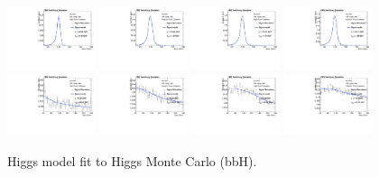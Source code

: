 \begin{figure}[thb]
  \centering
\includegraphics[width=0.23\textwidth]{figures/sec-signals/HiggsShapes/bbh_HM_signal_fit_mgg_cat0.pdf}
\includegraphics[width=0.23\textwidth]{figures/sec-signals/HiggsShapes/bbh_HM_signal_fit_mgg_cat1.pdf}
\includegraphics[width=0.23\textwidth]{figures/sec-signals/HiggsShapes/bbh_LM_signal_fit_mgg_cat0.pdf}
\includegraphics[width=0.23\textwidth]{figures/sec-signals/HiggsShapes/bbh_LM_signal_fit_mgg_cat1.pdf}
\includegraphics[width=0.23\textwidth]{figures/sec-signals/HiggsShapes/bbh_HM_signal_fit_mjj_cat0.pdf}
\includegraphics[width=0.23\textwidth]{figures/sec-signals/HiggsShapes/bbh_HM_signal_fit_mjj_cat1.pdf}
\includegraphics[width=0.23\textwidth]{figures/sec-signals/HiggsShapes/bbh_LM_signal_fit_mjj_cat0.pdf}
\includegraphics[width=0.23\textwidth]{figures/sec-signals/HiggsShapes/bbh_LM_signal_fit_mjj_cat1.pdf}
  \caption{Higgs model fit to Higgs Monte Carlo (bbH).}
  \label{fig:higgs_fit_bbh}
\end{figure}


